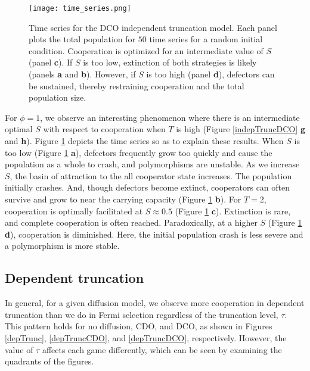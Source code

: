 \documentclass[reprint,aps,pre,twocolumn]{revtex4-1}
\begin{document}

\begin{figure}
\texttt{[image: time\_series.png]}
\caption{Time series for the DCO independent truncation model. Each panel plots the total population for $50$ time series for a random initial condition. Cooperation is optimized for an intermediate value of $S$ (panel \textbf{c}). If $S$ is too low, extinction of both strategies is likely (panels \textbf{a} and \textbf{b}). However, if $S$ is too high (panel \textbf{d}), defectors can be sustained, thereby restraining cooperation and the total population size.}
\label{time_series}
\end{figure}

For $\phi = 1$, we observe an interesting phenomenon where there is an intermediate optimal $S$ with respect to cooperation when $T$ is high (Figure \ref{indepTruncDCO} \textbf{g} and \textbf{h}). Figure \ref{time_series} depicts the time series so as to explain these results. When $S$ is too low (Figure \ref{time_series} \textbf{a}), defectors frequently grow too quickly and cause the population as a whole to crash, and polymorphisms are unstable. As we increase $S$, the basin of attraction to the all cooperator state increases. The population initially crashes. And, though defectors become extinct, cooperators can often survive and grow to near the carrying capacity (Figure \ref{time_series} \textbf{b}). For $T = 2$, cooperation is optimally facilitated at $S \approx 0.5$ (Figure \ref{time_series} \textbf{c}). Extinction is rare, and complete cooperation is often reached. Paradoxically, at a higher $S$ (Figure \ref{time_series} \textbf{d}), cooperation is diminished. Here, the initial population crash is less severe and a polymorphism is more stable.

\subsection{Dependent truncation}

In general, for a given diffusion model, we observe more cooperation in dependent truncation than we do in Fermi selection regardless of the truncation level, $\tau$. This pattern holds for no diffusion, CDO, and DCO, as shown in Figures \ref{depTrunc}, \ref{depTruncCDO}, and \ref{depTruncDCO}, respectively. However, the value of $\tau$ affects each game differently, which can be seen by examining the quadrants of the figures.
\end{document}
